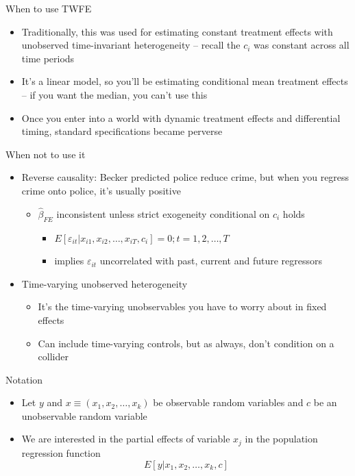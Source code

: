 \documentclass{beamer}
\begin{document}
\begin{frame}{When to use TWFE}

\begin{itemize}
\item Traditionally, this was used for estimating constant treatment effects with unobserved time-invariant heterogeneity -- recall the $c_i$ was constant across all time periods
\item It's a linear model, so you'll be estimating conditional mean treatment effects -- if you want the median, you can't use this
\item Once you enter into a world with dynamic treatment effects and differential timing, standard specifications became perverse
\end{itemize}

\end{frame}

\begin{frame}{When not to use it}

	\begin{itemize}
		\item Reverse causality: Becker predicted police reduce crime, but when you regress crime onto police, it's usually positive 
			\begin{itemize}
			\item $\widehat{\beta}_{FE}$ inconsistent unless strict exogeneity conditional on $c_i$ holds
				\begin{itemize}
				\item $E[\varepsilon_{it} | x_{i1},x_{i2},\dots,x_{iT},c_i]=0; t=1,2,\dots,T$
				\item implies $\varepsilon_{it}$ uncorrelated with past, current and future regressors
				\end{itemize}
			\end{itemize}
		\item Time-varying unobserved heterogeneity
			\begin{itemize}
			\item It's the time-varying unobservables you have to worry about in fixed effects
			\item Can include time-varying controls, but as always, don't condition on a collider
			\end{itemize}
	\end{itemize}
\end{frame}


\begin{frame}{Notation}

	
	\begin{itemize}
	\item Let $y$ and $x\equiv(x_1, x_2, \dots, x_k)$ be observable random variables and $c$ be an unobservable random variable
	\item We are interested in the partial effects of variable $x_j$ in the population regression function$$E[y|x_1,x_2,\dots,x_k,c]$$
	\end{itemize}
\end{frame}
\end{document}
